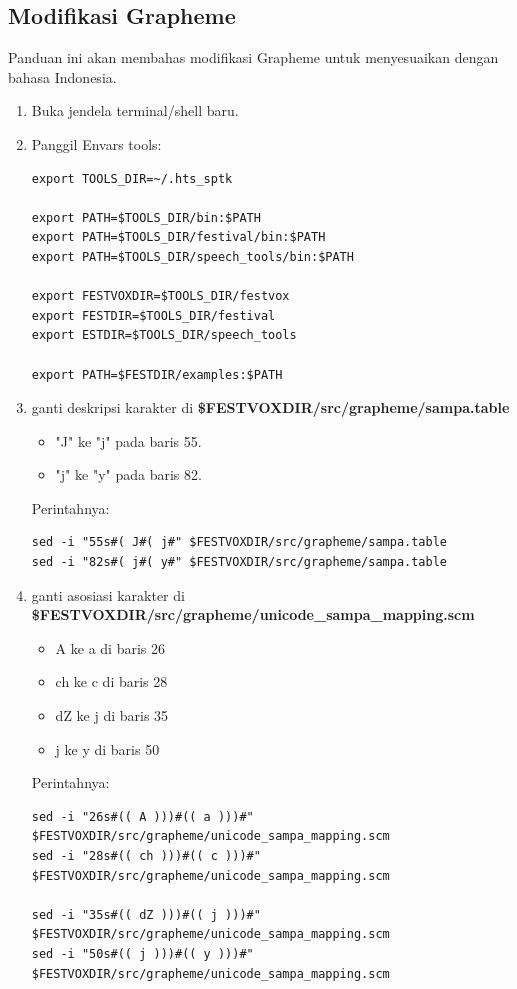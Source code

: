 \documentclass[12pt,]{article}
\begin{document}
	\newpage
	\subsection{Modifikasi Grapheme}

	Panduan ini akan membahas modifikasi Grapheme untuk menyesuaikan dengan bahasa Indonesia.

	\begin{enumerate}
		\item Buka jendela terminal/shell baru.

		\item Panggil Envars tools:
		\begin{verbatim}
export TOOLS_DIR=~/.hts_sptk

export PATH=$TOOLS_DIR/bin:$PATH
export PATH=$TOOLS_DIR/festival/bin:$PATH
export PATH=$TOOLS_DIR/speech_tools/bin:$PATH

export FESTVOXDIR=$TOOLS_DIR/festvox
export FESTDIR=$TOOLS_DIR/festival
export ESTDIR=$TOOLS_DIR/speech_tools

export PATH=$FESTDIR/examples:$PATH
		\end{verbatim}

		\item ganti deskripsi karakter di \textbf{\$FESTVOXDIR/src/grapheme/sampa.table}
		\begin{itemize}
			\item "J" ke "j" pada baris 55.
			\item "j" ke "y" pada baris 82.
		\end{itemize}

		Perintahnya:
		\begin{verbatim}
sed -i "55s#( J#( j#" $FESTVOXDIR/src/grapheme/sampa.table
sed -i "82s#( j#( y#" $FESTVOXDIR/src/grapheme/sampa.table
		\end{verbatim}

		\item ganti asosiasi karakter di \textbf{\$FESTVOXDIR/src/grapheme/unicode\_sampa\_mapping.scm}
		\begin{itemize}
			\item A ke a di baris 26
			\item ch ke c di baris 28
			\item dZ ke j di baris 35
			\item j ke y di baris 50
		\end{itemize}

		Perintahnya:
		\begin{verbatim}
sed -i "26s#(( A )))#(( a )))#" $FESTVOXDIR/src/grapheme/unicode_sampa_mapping.scm
sed -i "28s#(( ch )))#(( c )))#" $FESTVOXDIR/src/grapheme/unicode_sampa_mapping.scm

sed -i "35s#(( dZ )))#(( j )))#" $FESTVOXDIR/src/grapheme/unicode_sampa_mapping.scm
sed -i "50s#(( j )))#(( y )))#" $FESTVOXDIR/src/grapheme/unicode_sampa_mapping.scm
		\end{verbatim}

	\end{enumerate}
\end{document}
